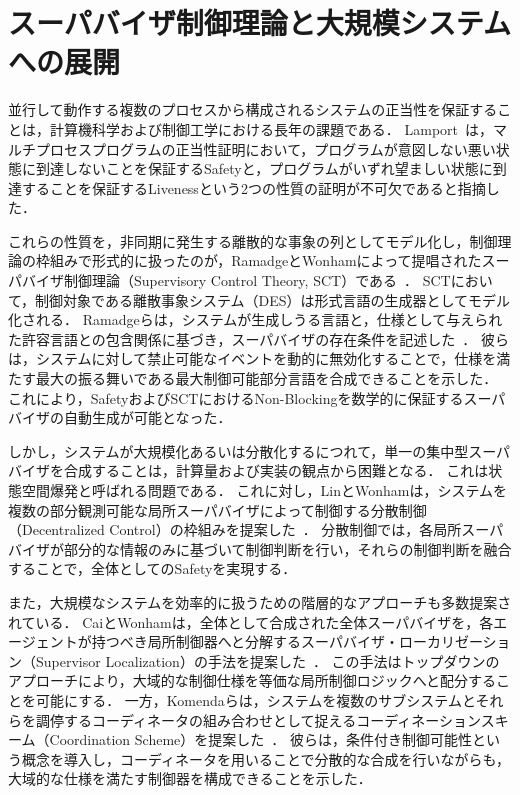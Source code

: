 \documentclass[a4paper,11pt,oneside,openany,report,dvipdfmx]{jsbook}
\begin{document}
\section{スーパバイザ制御理論と大規模システムへの展開}

並行して動作する複数のプロセスから構成されるシステムの正当性を保証することは，計算機科学および制御工学における長年の課題である．
Lamport~\cite{ProvingTheCorrectnessOfMultiprocessPrograms}は，マルチプロセスプログラムの正当性証明において，プログラムが意図しない悪い状態に到達しないことを保証するSafetyと，プログラムがいずれ望ましい状態に到達することを保証するLivenessという2つの性質の証明が不可欠であると指摘した．

これらの性質を，非同期に発生する離散的な事象の列としてモデル化し，制御理論の枠組みで形式的に扱ったのが，RamadgeとWonhamによって提唱されたスーパバイザ制御理論（Supervisory Control Theory, SCT）である~\cite{DiscreteControllerSynthesis, DiscreteEventSystem}．
SCTにおいて，制御対象である離散事象システム（DES）は形式言語の生成器としてモデル化される．
Ramadgeらは，システムが生成しうる言語と，仕様として与えられた許容言語との包含関係に基づき，スーパバイザの存在条件を記述した~\cite{DiscreteControllerSynthesis}．
彼らは，システムに対して禁止可能なイベントを動的に無効化することで，仕様を満たす最大の振る舞いである最大制御可能部分言語を合成できることを示した．
これにより，SafetyおよびSCTにおけるNon-Blockingを数学的に保証するスーパバイザの自動生成が可能となった．

しかし，システムが大規模化あるいは分散化するにつれて，単一の集中型スーパバイザを合成することは，計算量および実装の観点から困難となる．
これは状態空間爆発と呼ばれる問題である．
これに対し，LinとWonhamは，システムを複数の部分観測可能な局所スーパバイザによって制御する分散制御（Decentralized Control）の枠組みを提案した~\cite{DecentralizedSupervisoryControlOfDiscreteEventSystems}．
分散制御では，各局所スーパバイザが部分的な情報のみに基づいて制御判断を行い，それらの制御判断を融合することで，全体としてのSafetyを実現する．

また，大規模なシステムを効率的に扱うための階層的なアプローチも多数提案されている．
CaiとWonhamは，全体として合成された全体スーパバイザを，各エージェントが持つべき局所制御器へと分解するスーパバイザ・ローカリゼーション（Supervisor Localization）の手法を提案した~\cite{SupervisorLocalization}．
この手法はトップダウンのアプローチにより，大域的な制御仕様を等価な局所制御ロジックへと配分することを可能にする．
一方，Komendaらは，システムを複数のサブシステムとそれらを調停するコーディネータの組み合わせとして捉えるコーディネーションスキーム（Coordination Scheme）を提案した~\cite{SupervisoryControlSynthesisOfDiscreteEventSystemsUsingACoordinationScheme}．
彼らは，条件付き制御可能性という概念を導入し，コーディネータを用いることで分散的な合成を行いながらも，大域的な仕様を満たす制御器を構成できることを示した．
\end{document}
